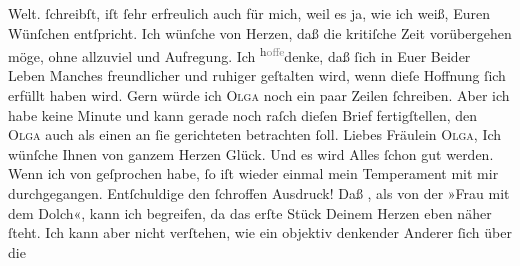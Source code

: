 \begin{ledgroupsized}[t]{13cm}
{{{                  Welt.}}}\label{K_L03097-2h} ſchreibſt, iſt ſehr erfreulich auch für mich, weil es ja, wie ich
               weiß, Euren Wünſchen entſpricht. Ich wünſche von Herzen, daß die kritiſche Zeit
               vorübergehen möge, ohne  allzuviel \label{K_L03097-3v}\label{K_L03097-3h} und Aufregung. Ich \substVorne{}\textsuperscript{h\textcolor{gray}{offe}}\substDazwischen{}denke\substHinten{}, daß ſich in Euer Beider Leben Manches freundlicher {\pb}und ruhiger geſtalten wird, wenn dieſe Hoffnung ſich
               erfüllt haben wird. Gern würde ich \textsc{Olga} noch ein paar
               Zeilen ſchreiben. Aber ich habe keine Minute und kann gerade noch raſch dieſen Brief
               fertigſtellen, den \textsc{Olga} auch als einen an ſie gerichteten
               betrachten ſoll. Liebes Fräulein \textsc{Olga}, Ich wünſche Ihnen
               von ganzem Herzen Glück. Und es wird Alles ſchon gut werden.\pend
           \pstart
           Wenn ich von \label{K_L03097-4v}\label{K_L03097-4h} geſprochen habe, ſo iſt wieder einmal mein Temperament mit mir durchgegangen.
               Entſchuldige den ſchroffen {\pb}Ausdruck! Daß \label{K_L03097-5v}\label{K_L03097-5h}, als von der »Frau mit dem Dolch«, kann
               ich begreifen, da das erſte Stück Deinem Herzen eben näher ſteht. Ich kann aber nicht verſtehen, wie ein
               objektiv denkender  Anderer ſich über die

\end{ledgroupsized}
